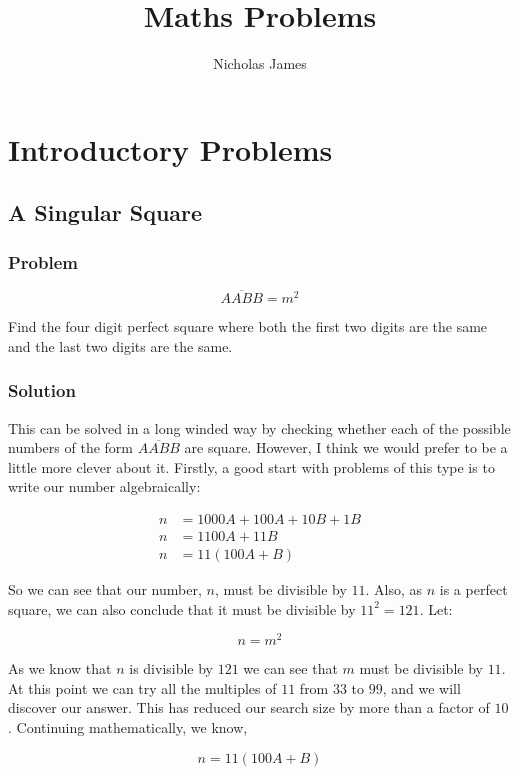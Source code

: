 \documentclass{book}
\title{Maths Problems}
\author{Nicholas James}
\begin{document}
\setlength{\parskip}{6pt}
\maketitle{}
\chapter{Introductory Problems}
\section{A Singular Square}
\subsection{Problem}
\[\overline{AABB}=m^2\]

Find the four digit perfect square where both the first two digits are the same and the last two digits are the same.

\subsection{Solution}

This can be solved in a long winded way by checking whether each of the possible numbers of the form \(\overline{AABB}\) are square. However, I think we would prefer to be a little more clever about it.
Firstly, a good start with problems of this type is to write our number algebraically:

\begin{align*}
  n&=1000A+100A+10B+1B\\
  n&=1100A+11B\\
  n&=11(100A+B)
\end{align*}

So we can see that our number, \(n\), must be divisible by \(11\). Also, as \(n\) is a perfect square, we can also conclude that it must be divisible by \(11^2=121\). Let:

\begin{equation*}
n=m^2
\end{equation*}

As we know that \(n\) is divisible by \(121\) we can see that \(m\) must be divisible by \(11\). At this point we can try all the multiples of \(11\) from \(33\) to \(99\), and we will discover our answer. This has reduced our search size by more than a factor of \(10\). Continuing mathematically, we know,

\begin{equation*}
n=11(100A+B)
\end{equation*}
\end{document}
